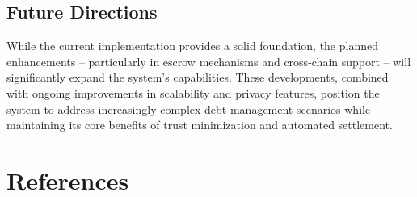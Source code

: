 \documentclass[twocolumn,10pt,a4paper]{article}
\begin{document}
\subsection{Future Directions}
While the current implementation provides a solid foundation, the planned enhancements – particularly in escrow mechanisms and cross-chain support – will significantly expand the system's capabilities. These developments, combined with ongoing improvements in scalability and privacy features, position the system to address increasingly complex debt management scenarios while maintaining its core benefits of trust minimization and automated settlement.

\section{References}
\end{document}

